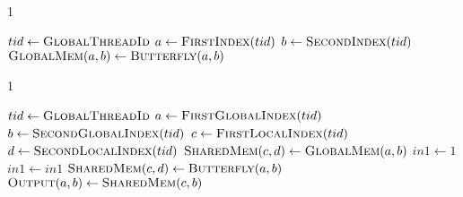 \documentclass[varwidth]{standalone}
\begin{document}
%
1\\%
\begin{algorithm}%
\begin{algorithmic}[1]%
%
	\State $tid \gets \Call{GlobalThreadId}{}$%
	\State $a \gets \Call{FirstIndex}{tid}$%
	\State $b \gets \Call{SecondIndex}{tid}$%
	\State $\Call{GlobalMem}{a,b} \gets \Call{Butterfly}{a,b}$%
\EndProcedure%
\end{algorithmic}%
\end{algorithm}%
1\\%
\begin{algorithm}%
\begin{algorithmic}[1]%
%
	\State $tid \gets \Call{GlobalThreadId}{}$%
	\State $a \gets \Call{FirstGlobalIndex}{tid}$%
	\State $b \gets \Call{SecondGlobalIndex}{tid}$%
	\State $c \gets \Call{FirstLocalIndex}{tid}$%
	\State $d \gets \Call{SecondLocalIndex}{tid}$%
	\State $\Call{SharedMem}{c,d} \gets \Call{GlobalMem}{a,b}$%
	\State $in1 \gets 1$%
	\State $in1 \gets in1$%
    	\State $\Call{SharedMem}{c,d} \gets \Call{Butterfly}{a,b}$%
    \EndFor%
	\State $\Call{Output}{a,b} \gets \Call{SharedMem}{c,b}$%
\EndProcedure%
\end{algorithmic}%
\end{algorithm}%
\end{document}

